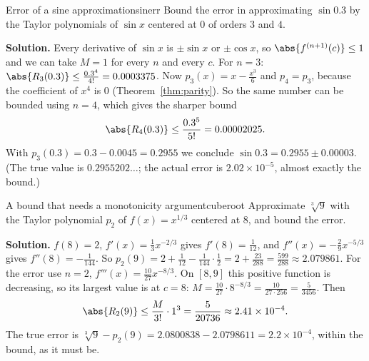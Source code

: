\documentclass[11pt]{article}
\begin{document}
\begin{exmp}{Error of a sine approximation}{sinerr}
Bound the error in approximating $\sin0.3$ by the Taylor polynomials of $\sin x$ centered at $0$ of orders $3$ and $4$.

\textbf{Solution.} Every derivative of $\sin x$ is $\pm\sin x$ or $\pm\cos x$, so $\abs{f^{(n+1)}(c)}\le1$ and we can take $M=1$ for every $n$ and every $c$. For $n=3$: $\abs{R_3(0.3)}\le\frac{0.3^4}{4!}=0.0003375$. Now $p_3(x)=x-\frac{x^3}6$ and $p_4=p_3$, because the coefficient of $x^4$ is $0$ (Theorem~\ref{thm:parity}). So the same number can be bounded using $n=4$, which gives the sharper bound
\[
\abs{R_4(0.3)}\le\frac{0.3^5}{5!}=0.00002025 .
\]
With $p_3(0.3)=0.3-0.0045=0.2955$ we conclude $\sin0.3=0.2955\pm0.00003$. (The true value is $0.2955202\ldots$; the actual error is $2.02\times10^{-5}$, almost exactly the bound.)
\end{exmp}

\begin{exmp}{A bound that needs a monotonicity argument}{cuberoot}
Approximate $\sqrt[3]9$ with the Taylor polynomial $p_2$ of $f(x)=x^{1/3}$ centered at $8$, and bound the error.

\textbf{Solution.} $f(8)=2$, $f'(x)=\frac13x^{-2/3}$ gives $f'(8)=\frac1{12}$, and $f''(x)=-\frac29x^{-5/3}$ gives $f''(8)=-\frac1{144}$. So $p_2(9)=2+\frac1{12}-\frac1{144}\cdot\frac12=2+\frac{23}{288}=\frac{599}{288}\approx2.079861$.
For the error use $n=2$, $f'''(x)=\frac{10}{27}x^{-8/3}$. On $[8,9]$ this positive function is decreasing, so its largest value is at $c=8$: $M=\frac{10}{27}\cdot8^{-8/3}=\frac{10}{27\cdot256}=\frac5{3456}$. Then
\[
\abs{R_2(9)}\le\frac M{3!}\cdot1^3=\frac5{20736}\approx2.41\times10^{-4}.
\]
The true error is $\sqrt[3]9-p_2(9)=2.0800838-2.0798611=2.2\times10^{-4}$, within the bound, as it must be.
\end{exmp}
\end{document}
